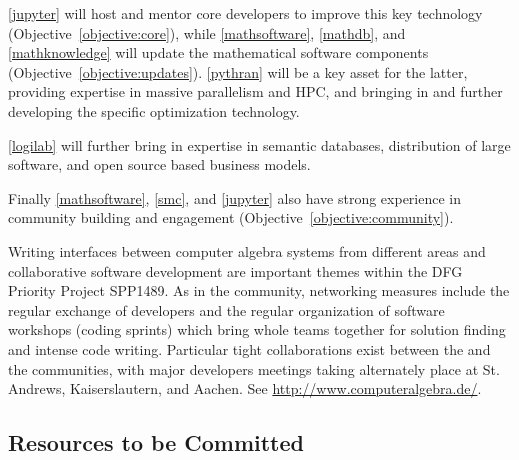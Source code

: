 \documentclass[noworkareas,deliverables,keys]{euproposal}                  %
\begin{document}
\begin{proposal}
\ref{jupyter} will host and mentor core \Jupyter developers to improve
this key technology (Objective~\ref{objective:core}), while
\ref{mathsoftware}, \ref{mathdb}, and \ref{mathknowledge} will update
the mathematical software components
(Objective~\ref{objective:updates}). \ref{pythran} will be a key asset
for the latter, providing expertise in massive parallelism and HPC,
and bringing in and further developing the specific \Pythran
optimization technology.

\ref{logilab} will further bring in expertise in semantic databases,
distribution of large software, and open source based business models.


Finally \ref{mathsoftware}, \ref{smc}, and \ref{jupyter} also have
strong experience in community building and engagement
(Objective~\ref{objective:community}).

Writing interfaces between computer algebra systems from different areas and collaborative 
software development are important themes within the DFG Priority Project SPP1489.
As in the {} community, networking measures include the regular exchange 
of developers and the regular organization of software workshops (coding sprints) which 
bring whole teams together for solution finding and intense code writing. Particular tight 
collaborations exist between the {} and the {} communities, with 
major {} developers meetings taking alternately place at St. Andrews,
Kaiserslautern, and Aachen. See \url{http://www.computeralgebra.de/}.


\draftpage

\subsection{Resources to be Committed}





\end{proposal}
\end{document}
